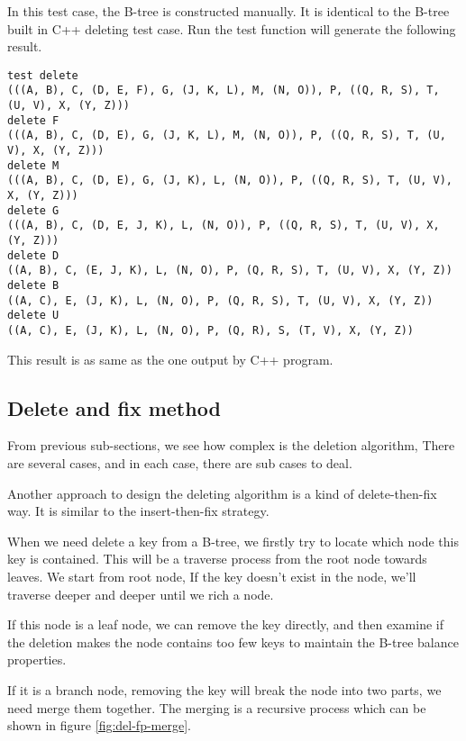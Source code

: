 \documentclass{article}
\begin{document}
In this test case, the B-tree is constructed manually. It is identical to
the B-tree built in C++ deleting test case. Run the test function will
generate the following result.

\begin{verbatim}
test delete
(((A, B), C, (D, E, F), G, (J, K, L), M, (N, O)), P, ((Q, R, S), T, (U, V), X, (Y, Z)))
delete F
(((A, B), C, (D, E), G, (J, K, L), M, (N, O)), P, ((Q, R, S), T, (U, V), X, (Y, Z)))
delete M
(((A, B), C, (D, E), G, (J, K), L, (N, O)), P, ((Q, R, S), T, (U, V), X, (Y, Z)))
delete G
(((A, B), C, (D, E, J, K), L, (N, O)), P, ((Q, R, S), T, (U, V), X, (Y, Z)))
delete D
((A, B), C, (E, J, K), L, (N, O), P, (Q, R, S), T, (U, V), X, (Y, Z))
delete B
((A, C), E, (J, K), L, (N, O), P, (Q, R, S), T, (U, V), X, (Y, Z))
delete U
((A, C), E, (J, K), L, (N, O), P, (Q, R), S, (T, V), X, (Y, Z))
\end{verbatim}

This result is as same as the one output by C++ program.


\subsection{Delete and fix method}

From previous sub-sections, we see how complex is the deletion algorithm,
There are several cases, and in each case, there are sub cases to deal.

Another approach to design the deleting algorithm is a kind of delete-then-fix
way. It is similar to the insert-then-fix strategy.

When we need delete a key from a B-tree, we firstly try to locate
which node this key is contained. This will be a traverse process
from the root node towards leaves. We start from root node, If the
key doesn't exist in the node, we'll traverse deeper and deeper
until we rich a node.

If this node is a leaf node, we can remove the key directly, and then
examine if the deletion makes the node contains too few keys to
maintain the B-tree balance properties.

If it is a branch node, removing the key will break the node into
two parts, we need merge them together. The merging is a recursive
process which can be shown in figure \ref{fig:del-fp-merge}.
\end{document}
